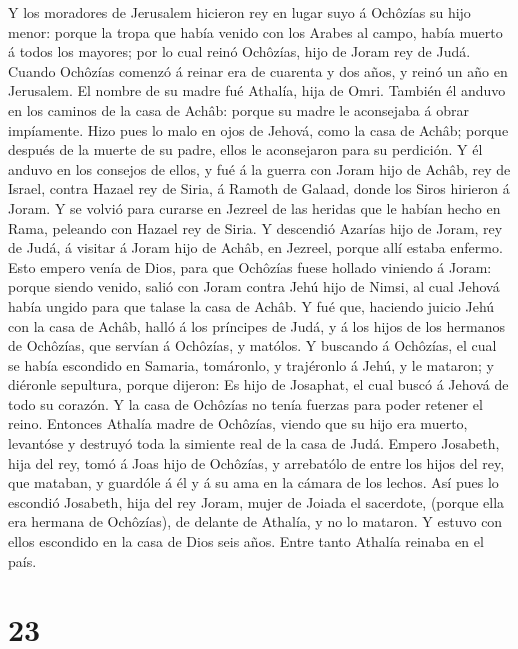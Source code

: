  Y los moradores de Jerusalem hicieron rey en lugar suyo á
Ochôzías su hijo menor: porque la tropa que había venido con los Arabes
al campo, había muerto á todos los mayores; por lo cual reinó Ochôzías,
hijo de Joram rey de Judá.  Cuando Ochôzías comenzó á
reinar era de cuarenta y dos años, y reinó un año en Jerusalem. El
nombre de su madre fué Athalía, hija de Omri.  También él
anduvo en los caminos de la casa de Achâb: porque su madre le aconsejaba
á obrar impíamente.  Hizo pues lo malo en ojos de Jehová,
como la casa de Achâb; porque después de la muerte de su padre, ellos le
aconsejaron para su perdición.  Y él anduvo en los
consejos de ellos, y fué á la guerra con Joram hijo de Achâb, rey de
Israel, contra Hazael rey de Siria, á Ramoth de Galaad, donde los Siros
hirieron á Joram.  Y se volvió para curarse en Jezreel de
las heridas que le habían hecho en Rama, peleando con Hazael rey de
Siria. Y descendió Azarías hijo de Joram, rey de Judá, á visitar á Joram
hijo de Achâb, en Jezreel, porque allí estaba enfermo. 
Esto empero venía de Dios, para que Ochôzías fuese hollado viniendo á
Joram: porque siendo venido, salió con Joram contra Jehú hijo de Nimsi,
al cual Jehová había ungido para que talase la casa de Achâb.
 Y fué que, haciendo juicio Jehú con la casa de Achâb,
halló á los príncipes de Judá, y á los hijos de los hermanos de
Ochôzías, que servían á Ochôzías, y matólos.  Y buscando á
Ochôzías, el cual se había escondido en Samaria, tomáronlo, y trajéronlo
á Jehú, y le mataron; y diéronle sepultura, porque dijeron: Es hijo de
Josaphat, el cual buscó á Jehová de todo su corazón. Y la casa de
Ochôzías no tenía fuerzas para poder retener el reino. 
Entonces Athalía madre de Ochôzías, viendo que su hijo era muerto,
levantóse y destruyó toda la simiente real de la casa de Judá.
 Empero Josabeth, hija del rey, tomó á Joas hijo de
Ochôzías, y arrebatólo de entre los hijos del rey, que mataban, y
guardóle á él y á su ama en la cámara de los lechos. Así pues lo
escondió Josabeth, hija del rey Joram, mujer de Joiada el sacerdote,
(porque ella era hermana de Ochôzías), de delante de Athalía, y no lo
mataron.  Y estuvo con ellos escondido en la casa de Dios
seis años. Entre tanto Athalía reinaba en el país.

\hypertarget{section-22}{%
\section{23}\label{section-22}}

